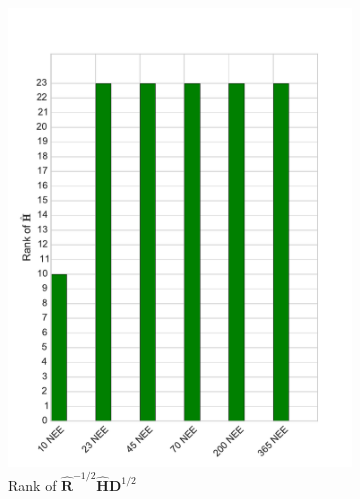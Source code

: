 \begin{figure}[ht]
    \centering
    \begin{subfigure}[b]{0.4\textwidth}
        \includegraphics[width=\textwidth]{chapter/chapter5/dalec2_obsrankcvtwind.pdf}
        \caption{Rank of $\hat{\textbf{R}}^{-1/2}\hat{\textbf{H}}\textbf{D}^{1/2}$}
        \label{chap5:fig:D2_observailityrankcvtwind}
    \end{subfigure}
    \begin{subfigure}[b]{0.4\textwidth}

\end{subfigure}
\end{figure}
